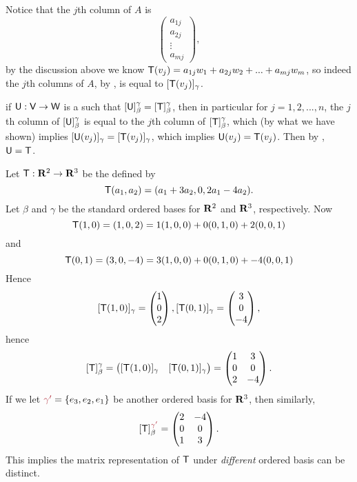 \begin{remark} \label{remark 2.2.2}
Notice that the \(j\)th column of \(A\) is
\[
    \begin{pmatrix} a_{1j} \\ a_{2j} \\ \vdots \\ a_{mj} \end{pmatrix},
\]
by the discussion above we know \(\textsf{T}(v_j) = a_{1j} w_1 + a_{2j} w_2 + ... + a_{mj} w_m\),
so indeed the \(j\)th columns of \(A\), by , is equal to \([\textsf{T}(v_j)]_{\gamma}\).

 if \(\textsf{U}: \textsf{V} \to \textsf{W}\) is a \LTRAN{} such that \([\textsf{U}]_{\beta}^{\gamma} = [\textsf{T}]_{\beta}^{\gamma}\),
then in particular for \(j = 1, 2, ..., n\), the \(j\)th column of \([\textsf{U}]_{\beta}^{\gamma}\) is equal to the \(j\)th column of \([\textsf{T}]_{\beta}^{\gamma}\),
which (by what we have shown) implies \([\textsf{U}(v_j)]_{\gamma} = [\textsf{T}(v_j)]_{\gamma}\),
which implies \(\textsf{U}(v_j) = \textsf{T}(v_j)\).
Then by , \(\textsf{U} = \textsf{T}\).
\end{remark}

\begin{example} \label{example 2.2.3}
Let \(\textsf{T} : \mathbf{R}^2 \to \mathbf{R}^3\) be the \LTRAN{} defined by
\[
    \textsf{T}(a_1, a_2) = (a_1 + 3a_2, 0, 2a_1 - 4a_2).
\]
Let \(\beta\) and \(\gamma\) be the standard ordered bases for \(\mathbf{R}^2\) and \(\mathbf{R}^3\), respectively.
Now
\[
    \textsf{T}(1, 0) = (1, 0, 2) = 1(1, 0, 0) + 0(0, 1, 0) + 2(0, 0, 1)
\]
and
\[
    \textsf{T}(0, 1) = (3, 0, -4) = 3(1, 0, 0) + 0(0, 1, 0) + -4(0, 0, 1)
\]
Hence
\[
    [\textsf{T}(1, 0)]_{\gamma} = \begin{pmatrix} 1 \\ 0 \\ 2 \end{pmatrix},
    [\textsf{T}(0, 1)]_{\gamma} = \begin{pmatrix} 3 \\ 0 \\ -4 \end{pmatrix},
\]
hence
\[
    [\textsf{T}]_{\beta}^{\gamma} = \begin{pmatrix} [\textsf{T}(1, 0)]_{\gamma} & [\textsf{T}(0, 1)]_{\gamma} \end{pmatrix}
    = \begin{pmatrix} 1 & 3 \\ 0 & 0 \\ 2 & -4 \end{pmatrix}.
\]
If we let \(\MAROON{\gamma'} = \{ e_3, e_2, e_1 \}\) be another ordered basis for \(\mathbf{R}^3\), then similarly,
\[
    [\T]_{\beta}^{\MAROON{\gamma'}} = \begin{pmatrix} 2 & -4 \\ 0 & 0 \\ 1 & 3 \end{pmatrix}.
\]
This implies the matrix representation of \(\textsf{T}\) under \emph{different} ordered basis can be distinct.
\end{example}

